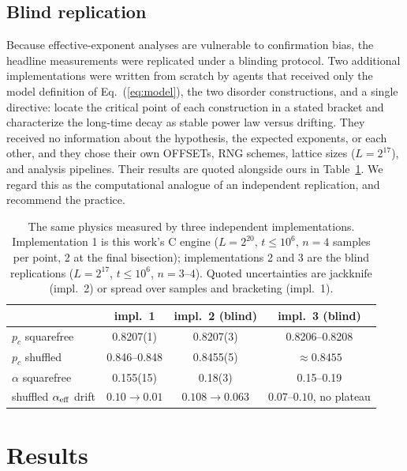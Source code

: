 \documentclass[aps,pre,twocolumn,superscriptaddress,nofootinbib]{revtex4-2}
\begin{document}
\subsection{Blind replication}

Because effective-exponent analyses are vulnerable to confirmation bias, the headline
measurements were replicated under a blinding protocol. Two additional implementations were
written from scratch by agents that received only the model definition of
Eq.~(\ref{eq:model}), the two disorder constructions, and a single directive: locate the
critical point of each construction in a stated bracket and characterize the long-time decay
as stable power law versus drifting. They received no information about the hypothesis, the
expected exponents, or each other, and they chose their own OFFSETs, RNG schemes, lattice
sizes ($L=2^{17}$), and analysis pipelines. Their results are quoted alongside ours in
Table~\ref{tab:results}. We regard this as the computational analogue of an independent
replication, and recommend the practice.

\begin{table}[t]
\caption{\label{tab:results}The same physics measured by three independent implementations.
Implementation 1 is this work's C engine ($L=2^{20}$, $t\le 10^6$, $n=4$ samples per point,
2 at the final bisection); implementations 2 and 3 are the blind replications
($L=2^{17}$, $t \le 10^6$, $n=3$--$4$). Quoted uncertainties are jackknife (impl.~2) or
spread over samples and bracketing (impl.~1).}
\begin{ruledtabular}
\begin{tabular}{lccc}
 & impl.~1 & impl.~2 (blind) & impl.~3 (blind) \\
\hline
$p_c$ squarefree & 0.8207(1) & 0.8207(3) & 0.8206--0.8208 \\
$p_c$ shuffled & 0.846--0.848 & 0.8455(5) & $\approx 0.8455$ \\
$\alpha$ squarefree & 0.155(15) & 0.18(3) & 0.15--0.19 \\
shuffled $\alpha_{\rm eff}$ drift & $0.10 \to 0.01$ & $0.108 \to 0.063$ & $0.07$--$0.10$, no plateau \\
\end{tabular}
\end{ruledtabular}
\end{table}

\section{Results}
\end{document}
